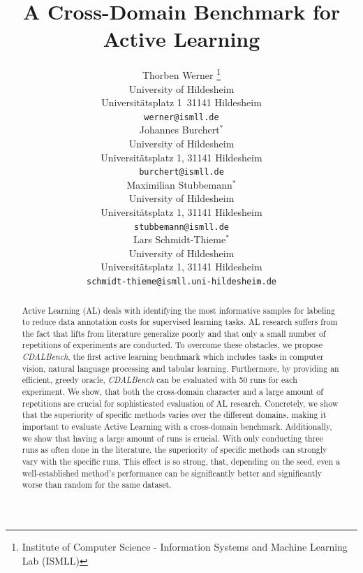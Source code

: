 \documentclass[]{article}
\title{A Cross-Domain Benchmark for Active Learning}
\author{%
	Thorben Werner 
	\thanks{Institute of Computer Science - Information Systems and Machine Learning Lab (ISMLL)} 
	\\
	University of Hildesheim\\
	Universitätsplatz 1\, 31141 Hildesheim \\
	\texttt{werner@ismll.de} \\
	\And
	Johannes Burchert$^*$ \\
	University of Hildesheim\\
	Universitätsplatz 1, 31141 Hildesheim \\
	\texttt{burchert@ismll.de} \\
	\And
	Maximilian Stubbemann$^*$ \\
	University of Hildesheim\\
	Universitätsplatz 1, 31141 Hildesheim \\
	\texttt{stubbemann@ismll.de} \\
	\AND
	Lars Schmidt-Thieme$^*$ \\
	University of Hildesheim\\
	Universitätsplatz 1, 31141 Hildesheim \\
	\texttt{schmidt-thieme@ismll.uni-hildesheim.de}
}
\begin{document}
	


\maketitle


\begin{abstract}

Active Learning (AL) deals with identifying the most informative samples for
labeling to reduce data annotation costs for supervised learning tasks. AL
research suffers from the fact that lifts from literature generalize poorly and
that only a small number of repetitions of experiments are conducted. To overcome
these obstacles, we propose \emph{CDALBench}, the first active learning benchmark
which includes tasks in computer vision, natural language processing and tabular
learning. Furthermore, by providing an efficient, greedy oracle, \emph{CDALBench}
can be evaluated with 50 runs for each experiment. We show, that both the
cross-domain character and a large amount of repetitions are crucial for
sophisticated evaluation of AL research. Concretely, we show that the
superiority of specific methods varies over the different domains, making it
important to evaluate Active Learning with a cross-domain benchmark.
Additionally, we show that having a large amount of runs is crucial. With only
conducting three runs as often done in the literature, the superiority of
specific methods can strongly vary with the specific runs. This effect is so strong, that, depending on the seed, even a well-established method's performance can be significantly better and significantly
worse than random for the same dataset. 
\end{abstract}

\end{document}
